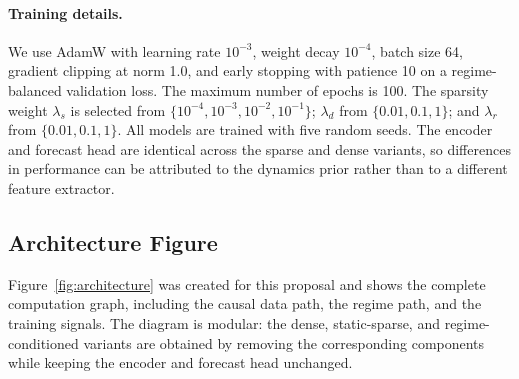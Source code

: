 \documentclass{article}
\begin{document}
\paragraph{Training details.}
We use AdamW with learning rate $10^{-3}$, weight decay $10^{-4}$, batch size 64, gradient clipping at norm 1.0, and early stopping with patience 10 on a regime-balanced validation loss. The maximum number of epochs is 100. The sparsity weight $\lambda_s$ is selected from $\{10^{-4},10^{-3},10^{-2},10^{-1}\}$; $\lambda_d$ from $\{0.01,0.1,1\}$; and $\lambda_r$ from $\{0.01,0.1,1\}$. All models are trained with five random seeds. The encoder and forecast head are identical across the sparse and dense variants, so differences in performance can be attributed to the dynamics prior rather than to a different feature extractor.

\subsection{Architecture Figure}

Figure~\ref{fig:architecture} was created for this proposal and shows the complete computation graph, including the causal data path, the regime path, and the training signals. The diagram is modular: the dense, static-sparse, and regime-conditioned variants are obtained by removing the corresponding components while keeping the encoder and forecast head unchanged.
\end{document}

